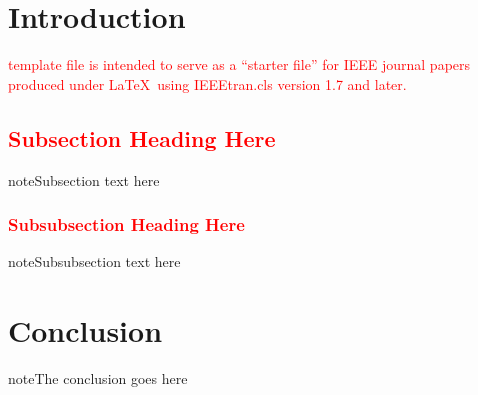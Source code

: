 \documentclass[journal]{IEEEtran}
\newcommand{\note}{\textcolor{red}} %
\begin{document}

\section{Introduction}
 \note{template file is intended to serve as a ``starter file''
for IEEE journal papers produced under \LaTeX\ using IEEEtran.cls version 1.7 and later.}


\subsection{\note{Subsection Heading Here}}
note{Subsection text here}


\subsubsection{\note{Subsubsection Heading Here}}
note{Subsubsection text here}


\section{Conclusion}
note{The conclusion goes here}

\appendices
\end{document}
